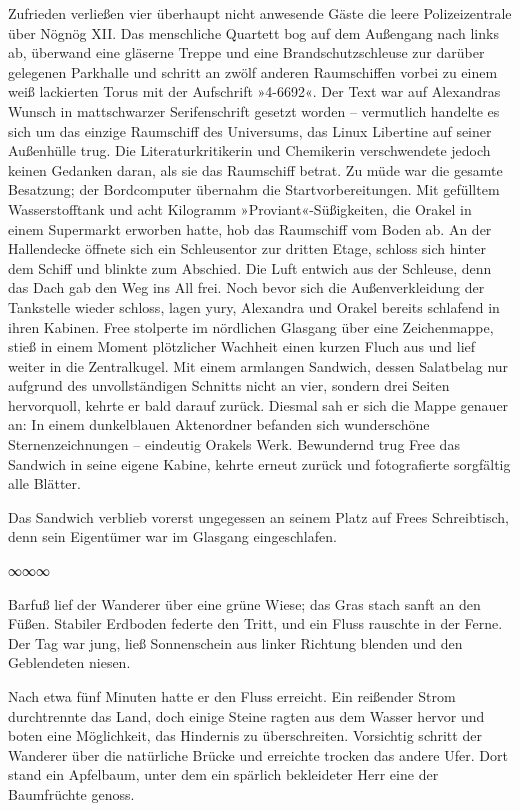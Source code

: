 Zufrieden verließen vier überhaupt nicht anwesende Gäste die leere Polizeizentrale über Nögnög XII. Das menschliche Quartett bog auf dem Außengang nach links ab, überwand eine gläserne Treppe und eine Brandschutzschleuse zur darüber gelegenen Parkhalle und schritt an zwölf anderen Raumschiffen vorbei zu einem weiß lackierten Torus mit der Aufschrift »4-6692«. Der Text war auf Alexandras Wunsch in mattschwarzer Serifenschrift gesetzt worden – vermutlich handelte es sich um das einzige Raumschiff des Universums, das Linux Libertine auf seiner Außenhülle trug. Die Literaturkritikerin und Chemikerin verschwendete jedoch keinen Gedanken daran, als sie das Raumschiff betrat. Zu müde war die gesamte Besatzung; der Bordcomputer übernahm die Startvorbereitungen. Mit gefülltem Wasserstofftank und acht Kilogramm »Proviant«-Süßigkeiten, die Orakel in einem Supermarkt erworben hatte, hob das Raumschiff vom Boden ab. An der Hallendecke öffnete sich ein Schleusentor zur dritten Etage, schloss sich hinter dem Schiff und blinkte zum Abschied. Die Luft entwich aus der Schleuse, denn das Dach gab den Weg ins All frei. Noch bevor sich die Außenverkleidung der Tankstelle wieder schloss, lagen yury, Alexandra und Orakel bereits schlafend in ihren Kabinen. Free stolperte im nördlichen Glasgang über eine Zeichenmappe, stieß in einem Moment plötzlicher Wachheit einen kurzen Fluch aus und lief weiter in die Zentralkugel. Mit einem armlangen Sandwich, dessen Salatbelag nur aufgrund des unvollständigen Schnitts nicht an vier, sondern drei Seiten hervorquoll, kehrte er bald darauf zurück. Diesmal sah er sich die Mappe genauer an: In einem dunkelblauen Aktenordner befanden sich wunderschöne Sternenzeichnungen – eindeutig Orakels Werk. Bewundernd trug Free das Sandwich in seine eigene Kabine, kehrte erneut zurück und fotografierte sorgfältig alle Blätter.

Das Sandwich verblieb vorerst ungegessen an seinem Platz auf Frees Schreibtisch, denn sein Eigentümer war im Glasgang eingeschlafen.

\begin{center}
∞∞∞
\end{center}

Barfuß lief der Wanderer über eine grüne Wiese; das Gras stach sanft an den Füßen. Stabiler Erdboden federte den Tritt, und ein Fluss rauschte in der Ferne. Der Tag war jung, ließ Sonnenschein aus linker Richtung blenden und den Geblendeten niesen.

Nach etwa fünf Minuten hatte er den Fluss erreicht. Ein reißender Strom durchtrennte das Land, doch einige Steine ragten aus dem Wasser hervor und boten eine Möglichkeit, das Hindernis zu überschreiten. Vorsichtig schritt der Wanderer über die natürliche Brücke und erreichte trocken das andere Ufer. Dort stand ein Apfelbaum, unter dem ein spärlich bekleideter Herr eine der Baumfrüchte genoss.

